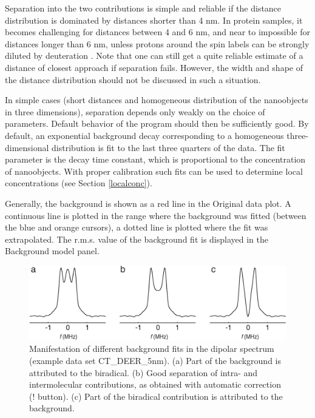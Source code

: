 \documentclass{article}
\begin{document}
Separation into the two contributions is simple and reliable if the distance
distribution is dominated by distances shorter than 4 nm. In protein samples, it
becomes challenging for distances between 4 and 6 nm, and near to impossible
for distances longer than 6 nm, unless protons around the spin labels can be
strongly diluted by deuteration \cite{jeschke2004b}. Note that one can still get a quite reliable estimate of a distance of closest approach if separation fails. However, the
width and shape of the distance distribution should not be discussed in such 
a situation. 

In simple cases (short distances and homogeneous distribution of the nanoobjects
in three dimensions), separation depends only weakly on the choice of parameters.
Default behavior of the program should then be sufficiently good.
By default, an exponential background decay corresponding to a homogeneous
three-dimensional distribution is fit to the last three quarters of the data. The
fit parameter is the decay time constant, which is proportional to the concentration
of nanoobjects. With proper calibration such fits can be used to determine
local concentrations (see Section \ref{localconc}).

Generally, the background is shown as a red line in the {\ttfamily Original data} plot. A continuous line is plotted in the range where the background was fitted (between the blue and orange cursors), a dotted line is plotted where the fit was extrapolated. The r.m.s. value of the background fit is displayed in the {\ttfamily Background model} panel.

\begin{figure}[ht]
 	\begin{center}
  \includegraphics[width=1.0\textwidth]{fig5.pdf}
	\end{center}
	\caption{Manifestation of different background fits in the dipolar spectrum
(example data set CT\_DEER\_5nm). (a) Part of the background is attributed to
the biradical. (b) Good separation of intra- and intermolecular contributions,
as obtained with automatic correction ({\ttfamily !} button). (c) Part of the biradical
contribution is attributed to the background.}
	\label{fig:manfig5}
\end{figure}
\end{document}
